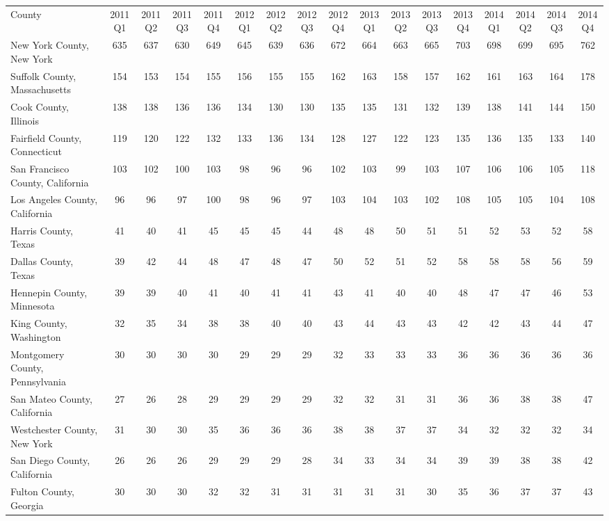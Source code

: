 \begin{landscape}
\begin{longtable}{lcccccccccccccccc}
	\setlength{\tabcolsep}{8pt}
	County &2011Q1 &2011Q2 &2011Q3 &2011Q4 &2012Q1 &2012Q2 &2012Q3 &2012Q4 &2013Q1 & 2013Q2 &2013Q3 &2013Q4 &2014Q1 &2014Q2 &2014Q3 & 2014Q4 \\
	New York County, New York & 635 & 637 & 630 & 649 & 645 & 639 & 636 & 672 & 664 & 663 & 665 & 703 & 698 & 699 & 695 & 762 \\
	Suffolk County, Massachusetts & 154 & 153 & 154 & 155 & 156 & 155 & 155 & 162 & 163 & 158 & 157 & 162 & 161 & 163 & 164 & 178 \\
	Cook County, Illinois & 138 & 138 & 136 & 136 & 134 & 130 & 130 & 135 & 135 & 131 & 132 & 139 & 138 & 141 & 144 & 150 \\
	Fairfield County, Connecticut & 119 & 120 & 122 & 132 & 133 & 136 & 134 & 128 & 127 & 122 & 123 & 135 & 136 & 135 & 133 & 140 \\
	San Francisco County, California & 103 & 102 & 100 & 103 & 98 & 96 & 96 & 102 & 103 & 99 & 103 & 107 & 106 & 106 & 105 & 118 \\
	Los Angeles County, California & 96 & 96 & 97 & 100 & 98 & 96 & 97 & 103 & 104 & 103 & 102 & 108 & 105 & 105 & 104 & 108 \\
	Harris County, Texas & 41 & 40 & 41 & 45 & 45 & 45 & 44 & 48 & 48 & 50 & 51 & 51 & 52 & 53 & 52 & 58 \\
	Dallas County, Texas & 39 & 42 & 44 & 48 & 47 & 48 & 47 & 50 & 52 & 51 & 52 & 58 & 58 & 58 & 56 & 59 \\
	Hennepin County, Minnesota & 39 & 39 & 40 & 41 & 40 & 41 & 41 & 43 & 41 & 40 & 40 & 48 & 47 & 47 & 46 & 53 \\
	King County, Washington & 32 & 35 & 34 & 38 & 38 & 40 & 40 & 43 & 44 & 43 & 43 & 42 & 42 & 43 & 44 & 47 \\
	Montgomery County, Pennsylvania & 30 & 30 & 30 & 30 & 29 & 29 & 29 & 32 & 33 & 33 & 33 & 36 & 36 & 36 & 36 & 36 \\
	San Mateo County, California & 27 & 26 & 28 & 29 & 29 & 29 & 29 & 32 & 32 & 31 & 31 & 36 & 36 & 38 & 38 & 47 \\
	Westchester County, New York & 31 & 30 & 30 & 35 & 36 & 36 & 36 & 38 & 38 & 37 & 37 & 34 & 32 & 32 & 32 & 34 \\
	San Diego County, California & 26 & 26 & 26 & 29 & 29 & 29 & 28 & 34 & 33 & 34 & 34 & 39 & 39 & 38 & 38 & 42 \\
	Fulton County, Georgia & 30 & 30 & 30 & 32 & 32 & 31 & 31 & 31 & 31 & 31 & 30 & 35 & 36 & 37 & 37 & 43 \\

\end{longtable}
\end{landscape}
